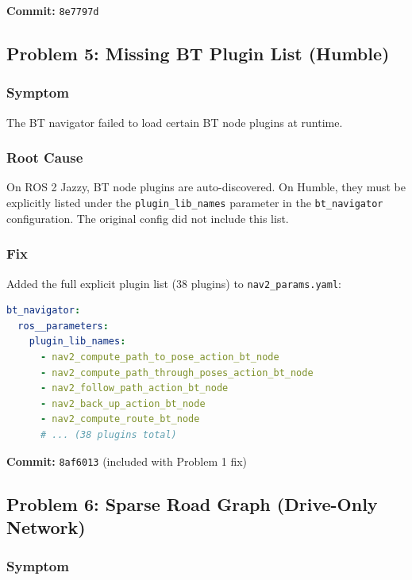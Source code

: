 \documentclass[11pt,a4paper]{article}
\begin{document}
\textbf{Commit:} \texttt{8e7797d}


\subsection{Problem 5: Missing BT Plugin List (Humble)}

\subsubsection*{Symptom}

The BT navigator failed to load certain BT node plugins at runtime.

\subsubsection*{Root Cause}

On ROS 2 Jazzy, BT node plugins are auto-discovered. On Humble, they must be explicitly listed under the \texttt{plugin\_lib\_names} parameter in the \texttt{bt\_navigator} configuration. The original config did not include this list.

\subsubsection*{Fix}

Added the full explicit plugin list (38 plugins) to \texttt{nav2\_params.yaml}:

\begin{lstlisting}[language=yaml,caption={nav2\_params.yaml --- bt\_navigator plugin list (excerpt)}]
bt_navigator:
  ros__parameters:
    plugin_lib_names:
      - nav2_compute_path_to_pose_action_bt_node
      - nav2_compute_path_through_poses_action_bt_node
      - nav2_follow_path_action_bt_node
      - nav2_back_up_action_bt_node
      - nav2_compute_route_bt_node
      # ... (38 plugins total)
\end{lstlisting}

\textbf{Commit:} \texttt{8af6013} (included with Problem 1 fix)


\subsection{Problem 6: Sparse Road Graph (Drive-Only Network)}

\subsubsection*{Symptom}
\end{document}
